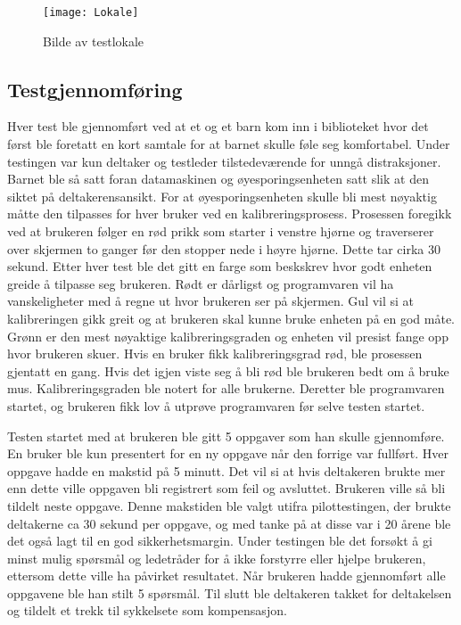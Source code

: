 \begin{figure}[ht!]
\centering
\texttt{[image: Lokale]}
\caption{Bilde av testlokale}
\label{fig:test_lokale}
\end{figure}


\subsection{Testgjennomføring}
Hver test ble gjennomført ved at et og et barn kom inn i biblioteket hvor det først ble foretatt en kort
samtale for at barnet skulle føle seg komfortabel. Under testingen var kun deltaker og testleder
tilstedeværende for unngå distraksjoner. Barnet ble så satt foran datamaskinen og øyesporingsenheten satt slik at den siktet på deltakerensansikt. For at øyesporingsenheten skulle bli mest nøyaktig måtte den tilpasses for hver bruker ved
en kalibreringsprosess. Prosessen foregikk ved at brukeren følger en rød prikk som starter i
venstre hjørne og traverserer over skjermen to ganger før den stopper nede i høyre hjørne. Dette
tar cirka 30 sekund. Etter hver test ble det gitt en farge som beskskrev hvor godt enheten greide å
tilpasse seg brukeren. Rødt er dårligst og programvaren vil ha vanskeligheter med å regne ut hvor
brukeren ser på skjermen. Gul vil si at kalibreringen gikk greit og at brukeren skal kunne bruke
enheten på en god måte. Grønn er den mest nøyaktige kalibreringsgraden og enheten vil presist
fange opp hvor brukeren skuer. Hvis en bruker fikk kalibreringsgrad rød, ble prosessen gjentatt en
gang. Hvis det igjen viste seg å bli rød ble brukeren bedt om å bruke mus. Kalibreringsgraden ble
notert for alle brukerne. Deretter ble programvaren startet, og brukeren fikk lov å utprøve programvaren før selve testen startet.

Testen startet med at brukeren ble  gitt 5 oppgaver som han skulle gjennomføre. En bruker ble kun presentert for en ny oppgave når den forrige var fullført. Hver oppgave hadde en makstid på 5 minutt. Det vil si at hvis deltakeren brukte mer enn dette ville oppgaven bli registrert som feil og avsluttet. Brukeren ville så bli tildelt neste oppgave. Denne makstiden ble valgt utifra pilottestingen, der brukte deltakerne ca 30 sekund per oppgave, og med tanke på at disse var i 20 årene ble det også lagt til en god sikkerhetsmargin. Under testingen ble det forsøkt å gi minst mulig spørsmål og ledetråder for å ikke forstyrre eller hjelpe brukeren, ettersom dette ville ha påvirket resultatet. Når brukeren hadde gjennomført alle oppgavene ble han stilt 5 spørsmål. Til slutt ble deltakeren takket for deltakelsen og tildelt et trekk til sykkelsete som kompensasjon.

